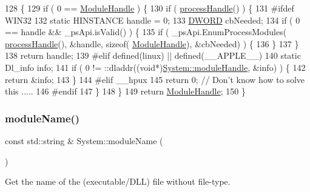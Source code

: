 \begin{DoxyCode}
128                                           \{
129   \textcolor{keywordflow}{if} ( 0 == \hyperlink{ModuleInfo_8cpp_ac73543ab438ca67795d960da1ae04464}{ModuleHandle} )    \{
130     \textcolor{keywordflow}{if} ( \hyperlink{namespaceSystem_a563f947d4a2921f4348ff4f8e909a9f2}{processHandle}() )    \{
131 \textcolor{preprocessor}{#ifdef WIN32}
132       \textcolor{keyword}{static} HINSTANCE handle = 0;
133       \hyperlink{CatCaloProto40MHz_2inc_2WinTypes_8h_ad342ac907eb044443153a22f964bf0af}{DWORD}   cbNeeded;
134       \textcolor{keywordflow}{if} ( 0 == handle && \_psApi.isValid() )    \{
135         \textcolor{keywordflow}{if} ( \_psApi.EnumProcessModules( \hyperlink{namespaceSystem_a563f947d4a2921f4348ff4f8e909a9f2}{processHandle}(), &handle, \textcolor{keyword}{sizeof}(
      \hyperlink{ModuleInfo_8cpp_ac73543ab438ca67795d960da1ae04464}{ModuleHandle}), &cbNeeded) )   \{
136         \}
137       \}
138       \textcolor{keywordflow}{return} handle;
139 \textcolor{preprocessor}{#elif defined(linux) || defined(\_\_APPLE\_\_)}
140       \textcolor{keyword}{static} Dl\_info info;
141       \textcolor{keywordflow}{if} ( 0 != ::dladdr((\textcolor{keywordtype}{void}*)\hyperlink{namespaceSystem_ab88d0de1d6850b6f95522e9c242eeab0}{System::moduleHandle}, &info) ) \{
142     \textcolor{keywordflow}{return} &info;
143       \}
144 \textcolor{preprocessor}{#elif \_\_hpux}
145       \textcolor{keywordflow}{return} 0;  \textcolor{comment}{// Don't know how to solve this .....}
146 \textcolor{preprocessor}{#endif}
147     \}
148   \}
149   \textcolor{keywordflow}{return} \hyperlink{ModuleInfo_8cpp_ac73543ab438ca67795d960da1ae04464}{ModuleHandle};
150 \}
\end{DoxyCode}
\mbox{\label{namespaceSystem_add155d288552032434ee9e25d130ad72}} 
\subsubsection{\texorpdfstring{module\+Name()}{moduleName()}}
{\footnotesize\ttfamily const std\+::string \& System\+::module\+Name (\begin{DoxyParamCaption}{ }\end{DoxyParamCaption})}



Get the name of the (executable/\+D\+LL) file without file-\/type. 


